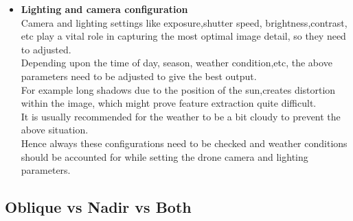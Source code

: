 \documentclass[11pt,twocolumn,letterpaper]{article}
\begin{document}
\begin{itemize}
        
    \item  \textbf{Lighting and camera configuration}
        \\ Camera and lighting settings like exposure,shutter speed, brightness,contrast, etc play a vital role in capturing the most optimal image detail, so they need to adjusted.
        \\ Depending upon the time of day, season, weather condition,etc, the above parameters need to be adjusted to give the best output. 
        \\ For example long shadows due to the position of the sun,creates distortion within the image, which might prove feature extraction quite difficult.
        \\ It is usually recommended for the weather to be a bit cloudy to prevent the above situation.
        \\ Hence always these configurations need to be checked and weather conditions should be accounted for while setting the drone camera and lighting parameters.
      

\end{itemize}

\subsection{Oblique vs Nadir vs Both}
\end{document}
